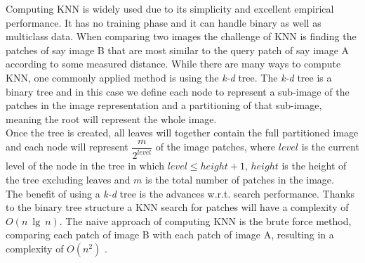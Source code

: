 Computing KNN is widely used due to its simplicity and excellent empirical performance. It has no training phase and it can handle binary as well as multiclass data. When comparing two images the challenge of KNN is finding the patches of say image B that are most similar to the query patch of say image A according to some measured distance. While there are many ways to compute KNN, one commonly applied method is using the \textit{k-d} tree. The \textit{k-d} tree is a binary tree and in this case we define each node to represent a sub-image of the patches in the image representation and a partitioning of that sub-image, meaning the root will represent the whole image.
\\[2mm]
Once the tree is created, all leaves will together contain the full partitioned image and each node will represent $\dfrac{m}{2^{level}}$ of the image patches, where $level$ is the current level of the node in the tree in which $level \leq height+1$, $height$ is the height of the tree excluding leaves and $m$ is the total number of patches in the image. 
\\[2mm]
The benefit of using a \textit{k-d} tree is the advances w.r.t. search performance. Thanks to the binary tree structure a KNN search for patches will have a complexity of $O(n\ \lg\ n)$. The naive approach of computing KNN is the brute force method, comparing each patch of image B with each patch of image A, resulting in a complexity of $O(n^2)$ \cite{logmatches}.
\\[2mm]



